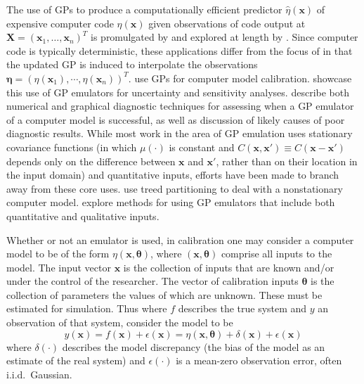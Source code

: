 \documentclass[12pt]{article}
\begin{document}
The use of GPs to produce a computationally efficient predictor $\hat \eta (\mathbf x)$ of expensive computer code $\eta(\mathbf x)$ given observations of code output at $\mathbf X=(\mathbf x_1,\ldots,\mathbf x_n)^T$ is promulgated by \cite{Sacks1989} and explored at length by \cite{Santner2003a}.
%
Since computer code is typically deterministic, these applications differ from the focus of \cite{OHagan1978} in that the updated GP is induced to interpolate the observations $\boldsymbol \eta = (\eta(\mathbf x_1),\cdots,\eta(\mathbf x_n))^T$. 
%
\cite{Kennedy2001} use GPs for computer model calibration. 
%
\cite{Kennedy2006} showcase this use of GP emulators for uncertainty and sensitivity analyses. 
%
\cite{Bastos2009} describe both numerical and graphical diagnostic techniques for assessing when a GP emulator of a computer model is successful, as well as discussion of likely causes of poor diagnostic results. 
%
While most work in the area of GP emulation uses stationary covariance functions (in which $\mu(\cdot)$ is constant and $C(\mathbf x,\mathbf x' )\equiv C(\mathbf x-\mathbf x' )$ depends only on the difference between $\mathbf x$ and $\mathbf x'$, rather than on their location in the input domain) and quantitative inputs, efforts have been made to branch away from these core uses. 
%
\cite{Gramacy2008} use treed partitioning to deal with a nonstationary computer model. 
%
\cite{Qian2008} explore methods for using GP emulators that include both quantitative and qualitative inputs.
%

Whether or not an emulator is used, in calibration one may consider a computer model to be of the form $\eta(\mathbf x,\boldsymbol \theta)$, where $(\mathbf x,\boldsymbol \theta)$ comprise all inputs to the model. 
%
The input vector $\mathbf x$ is the collection of inputs that are known and/or under the control of the researcher.
%
The vector of calibration inputs $\boldsymbol \theta$ is the collection of parameters the values of which are unknown. 
%
These must be estimated for simulation. 
%
Thus where $f$ describes the true system and $y$ an observation of that system, consider the model to be 
%
\begin{equation} \label{eq:model_gen}
y(\mathbf x)=f(\mathbf x)+\epsilon(\mathbf x)=\eta(\mathbf x,\boldsymbol \theta) + \delta(\mathbf x)+\epsilon(\mathbf x)
\end{equation} 
%
where $\delta(\cdot)$ describes the model discrepancy (the bias of the model as an estimate of the real system) and $\epsilon(\cdot)$ is a mean-zero observation error, often i.i.d.\ Gaussian. 
%
\end{document}
